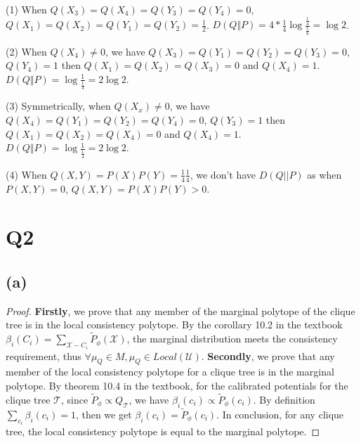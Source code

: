 \documentclass{article}
\begin{document}
\noindent (1) When $Q(X_3) = Q(X_4) = Q(Y_3) = Q(Y_4) = 0$, $Q(X_1) = Q(X_2) = Q(Y_1) = Q(Y_2) = \frac{1}{2}$.
$D(Q\Vert P) = 4 * \frac{1}{4}\log \frac{\frac{1}{4}}{\frac{1}{8}} = \log 2$.

\noindent (2) When $Q(X_4)\neq0$, we have $Q(X_3) = Q(Y_1) = Q(Y_2) = Q(Y_3) = 0$, $Q(Y_4) = 1$ then $Q(X_1) = Q(X_2) = Q(X_3) = 0$ and $Q(X_4) = 1$.
$D(Q\Vert P) = \log \frac{1}{\frac{1}{4}} = 2\log 2$.

\noindent (3) Symmetrically, when $Q(X_x)\neq0$, we have $Q(X_4) = Q(Y_1) = Q(Y_2) = Q(Y_4) = 0$, $Q(Y_3) = 1$ then $Q(X_1) = Q(X_2) = Q(X_4) = 0$ and $Q(X_4) = 1$.
$D(Q\Vert P) = \log \frac{1}{\frac{1}{4}} = 2\log 2$.

\noindent (4) When $Q(X, Y) = P(X)P(Y) = \frac{1}{4}\frac{1}{4}$, we don't have $D(Q||P)$ as when $P(X, Y) = 0$, $Q(X, Y) = P(X) P(Y) > 0$.

\section*{Q2}
\subsection*{(a)}
\begin{proof}
    \textbf{Firstly}, we prove that any member of the marginal polytope of the clique tree is in the local consistency polytope.
    By the corollary 10.2 in the textbook $\beta_i(C_i)=\sum_{\mathcal{X}-C_i}\tilde{P}_{\phi}(\mathcal{X})$, 
    the marginal distribution meets the consistency requirement, thus $\forall \mu_Q \in M, \mu_Q \in Local(\mathcal{U})$.
    \textbf{Secondly}, we prove that any member of the local consistency polytope for a clique tree is in the marginal polytope. By theorem 10.4 in the textbook,
    for the calibrated potentials for the clique tree $\mathcal{T}$, since $\tilde{P}_{\phi}\propto Q_{\mathcal{T}}$, we have $\beta_i(c_i) \propto \tilde{P}_{\phi}(c_i)$.
    By definition $\sum_{c_i}\beta_i(c_i)=1$, then we get $\beta_i(c_i) = \tilde{P}_{\phi}(c_i)$. In conclusion, for any clique tree, the local consistency polytope is equal to the marginal
    polytope.
\end{proof}
\end{document}
